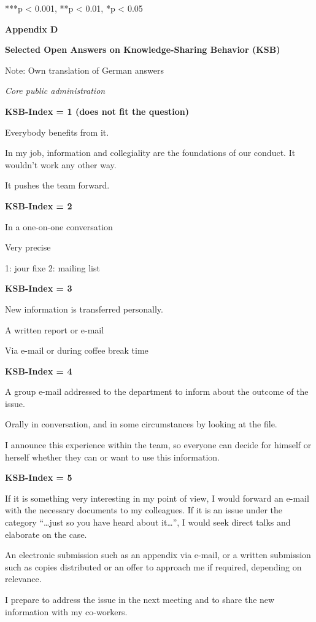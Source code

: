 \documentclass{article}
\begin{document}
***p < 0.001, **p < 0.01, *p < 0.05 





\textbf{}

\textbf{Appendix D}

\textbf{Selected Open Answers on Knowledge-Sharing Behavior (KSB)}

Note: Own translation of German answers

\emph{Core public administration}

\textbf{KSB-Index = 1 (does not fit the question)}

Everybody benefits from it.

In my job, information and collegiality are the foundations of our conduct. It wouldn't work any other way. 

It pushes the team forward.

\textbf{KSB-Index = 2}

In a one-on-one conversation

Very precise 

1: jour fixe 2: mailing list 

\textbf{KSB-Index = 3}

New information is transferred personally. 

A written report or e-mail

Via e-mail or during coffee break time

\textbf{KSB-Index = 4}

A group e-mail addressed to the department to inform about the outcome of the issue.

Orally in conversation, and in some circumstances by looking at the file. 

I announce this experience within the team, so everyone can decide for himself or herself whether they can or want to use this information.

\textbf{KSB-Index = 5}

If it is something very interesting in my point of view, I would forward an e-mail with the necessary documents to my colleagues. If it is an issue under the category “…just so you have heard about it…”, I would seek direct talks and elaborate on the case.

An electronic submission such as an appendix via e-mail, or a written submission such as copies distributed or an offer to approach me if required, depending on relevance.

I prepare to address the issue in the next meeting and to share the new information with my co-workers. 
\end{document}
